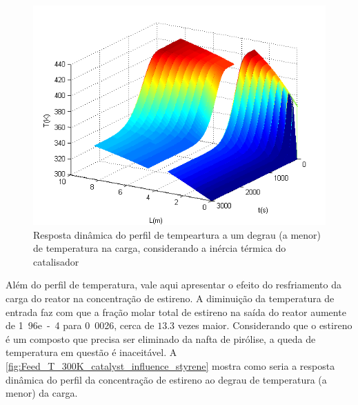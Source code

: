 \begin{figure}[htb]
\centering
\includegraphics[scale=0.8]{images/Chap4/Feed_T_300K_catalyst_influence.png}
\caption{Resposta dinâmica do perfil de tempeartura a um degrau (a menor) de
temperatura na carga, considerando a inércia térmica do catalisador}
\label{fig:Feed_T_300K_catalyst_influence}
\end{figure}

% 

Além do perfil de temperatura, vale aqui apresentar o efeito do resfriamento da
carga do reator na concentração de estireno. A diminuição da temperatura de
entrada faz com que a fração molar total de estireno na saída do reator aumente
de \si{1.96e-4}{} para \si{0.0026}{}, cerca de $13.3$ vezes maior. Considerando
que o estireno é um composto que precisa ser eliminado da nafta de pirólise, a
queda de temperatura em questão é inaceitável. A
\autoref{fig:Feed_T_300K_catalyst_influence_styrene} mostra como seria a
resposta dinâmica do perfil da concentração de estireno ao degrau de temperatura
(a menor) da carga.

